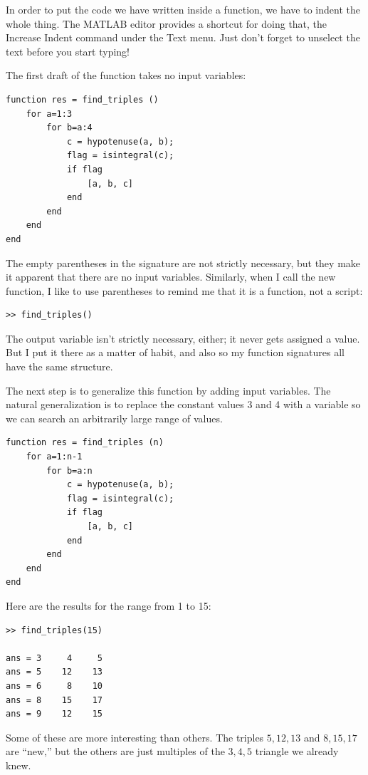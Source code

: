 \documentclass[
]{book}
\begin{document}
In order to put the code we have written inside a function, we
have to indent the whole thing.  The MATLAB editor provides a
shortcut for doing that, the {\sf Increase Indent} command
under the {\sf Text} menu.  Just don't forget to unselect the
text before you start typing!

The first draft of the function takes no input variables:

\begin{verbatim}
function res = find_triples ()
    for a=1:3
        for b=a:4
            c = hypotenuse(a, b);
            flag = isintegral(c);
            if flag
                [a, b, c]
            end
        end
    end
end
\end{verbatim}

The empty parentheses in the signature are not strictly necessary, but
they make it apparent that there are no input variables.  Similarly,
when I call the new function, I like to use parentheses to remind me
that it is a function, not a script:

\begin{verbatim}
>> find_triples()
\end{verbatim}

The output variable isn't strictly necessary, either; it
never gets assigned a value.  But I put it there as a matter of
habit, and also so my function signatures all have the same structure.

The next step is to generalize this function by adding input
variables.  The natural generalization is to replace the constant
values 3 and 4 with a variable so we can search an arbitrarily large
range of values.

\begin{verbatim}
function res = find_triples (n)
    for a=1:n-1
        for b=a:n
            c = hypotenuse(a, b);
            flag = isintegral(c);
            if flag
                [a, b, c]
            end
        end
    end
end
\end{verbatim}

Here are the results for the range from 1 to 15:

\begin{verbatim}
>> find_triples(15)

ans = 3     4     5
ans = 5    12    13
ans = 6     8    10
ans = 8    15    17
ans = 9    12    15
\end{verbatim}

Some of these are more interesting than others.  The triples
$5,12,13$ and $8,15,17$ are ``new,'' but the others are just
multiples of the $3,4,5$ triangle we already knew.
\end{document}
